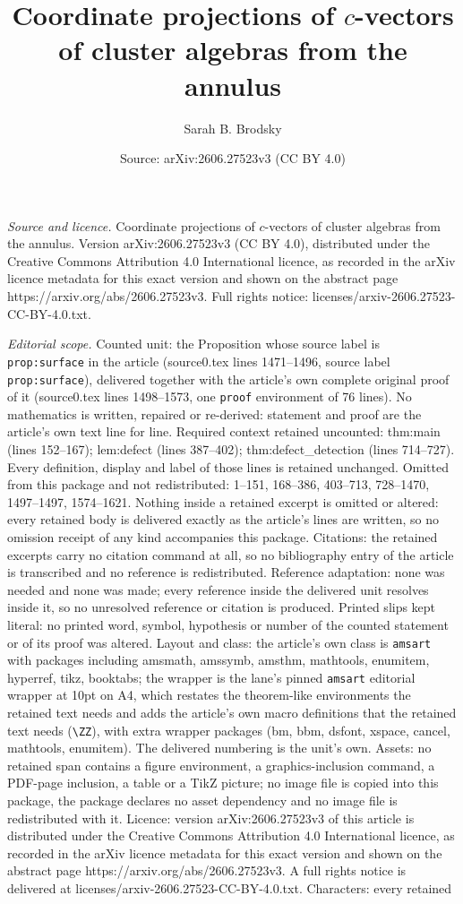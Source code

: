 \documentclass[10pt,a4paper]{amsart}
\title[Coordinate projections of $c$-vectors of cluster algebras fr]{Coordinate projections of $c$-vectors of cluster algebras from the annulus}
\author{Sarah B. Brodsky}
\date{Source: arXiv:2606.27523v3 (CC BY 4.0)}
\begin{document}
\maketitle

\noindent\emph{Source and licence.} Coordinate projections of $c$-vectors of cluster algebras from the annulus. Version arXiv:2606.27523v3 (CC BY 4.0), distributed under the Creative Commons Attribution 4.0 International licence, as recorded in the arXiv licence metadata for this exact version and shown on the abstract page https://arxiv.org/abs/2606.27523v3. Full rights notice: licenses/arxiv-2606.27523-CC-BY-4.0.txt.\par\smallskip

\noindent\textit{Editorial scope.} Counted unit: the Proposition whose source label is \texttt{prop:surface} in the article (source0.tex lines 1471--1496, source label \texttt{prop:surface}), delivered together with the article's own complete original proof of it (source0.tex lines 1498--1573, one \texttt{proof} environment of 76 lines). No mathematics is written, repaired or re-derived: statement and proof are the article's own text line for line. Required context retained uncounted: thm:main (lines 152--167); lem:defect (lines 387--402); thm:defect\_detection (lines 714--727). Every definition, display and label of those lines is retained unchanged. Omitted from this package and not redistributed: 1--151, 168--386, 403--713, 728--1470, 1497--1497, 1574--1621. Nothing inside a retained excerpt is omitted or altered: every retained body is delivered exactly as the article's lines are written, so no omission receipt of any kind accompanies this package. Citations: the retained excerpts carry no citation command at all, so no bibliography entry of the article is transcribed and no reference is redistributed. Reference adaptation: none was needed and none was made; every reference inside the delivered unit resolves inside it, so no unresolved reference or citation is produced. Printed slips kept literal: no printed word, symbol, hypothesis or number of the counted statement or of its proof was altered. Layout and class: the article's own class is \texttt{amsart} with packages including amsmath, amssymb, amsthm, mathtools, enumitem, hyperref, tikz, booktabs; the wrapper is the lane's pinned \texttt{amsart} editorial wrapper at 10pt on A4, which restates the theorem-like environments the retained text needs and adds the article's own macro definitions that the retained text needs (\texttt{\textbackslash ZZ}), with extra wrapper packages (bm, bbm, dsfont, xspace, cancel, mathtools, enumitem). The delivered numbering is the unit's own. Assets: no retained span contains a figure environment, a graphics-inclusion command, a PDF-page inclusion, a table or a TikZ picture; no image file is copied into this package, the package declares no asset dependency and no image file is redistributed with it. Licence: version arXiv:2606.27523v3 of this article is distributed under the Creative Commons Attribution 4.0 International licence, as recorded in the arXiv licence metadata for this exact version and shown on the abstract page https://arxiv.org/abs/2606.27523v3. A full rights notice is delivered at licenses/arxiv-2606.27523-CC-BY-4.0.txt. Characters: every retained 
\end{document}
